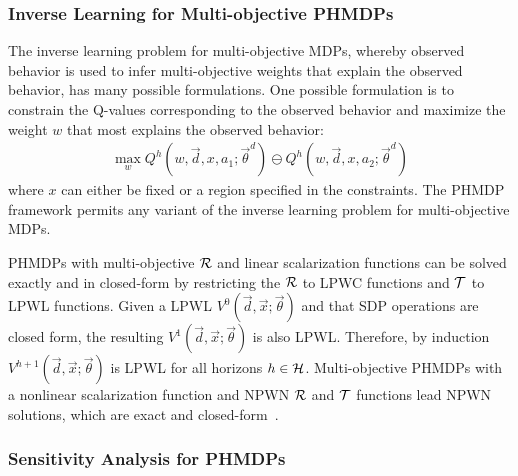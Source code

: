 
\subsubsection{Inverse Learning for Multi-objective PHMDPs}

The inverse learning problem for multi-objective MDPs, whereby observed behavior is used to infer multi-objective weights that explain the observed behavior, has many possible formulations. One possible formulation is to constrain the Q-values corresponding to the observed behavior and maximize the weight {\footnotesize $ w $} that most explains the observed behavior: 
\begin{align}
    \max_w Q^{h} \left(w, \vec{d}, x, a_1; \vec{\theta}^d \right) \ominus Q^{h} \left(w, \vec{d}, x, a_2; \vec{\theta}^d \right)
\end{align}
where {\footnotesize $ x $} can either be fixed or a region specified in the constraints. The PHMDP framework permits any variant of the inverse learning problem for multi-objective MDPs.

PHMDPs with multi-objective {\footnotesize $\mathcal{R}$} and linear scalarization functions can be solved exactly and in closed-form by restricting the {\footnotesize $\mathcal{R}$} to LPWC functions and {\footnotesize $\mathcal{T}$} to LPWL functions. Given a LPWL {\footnotesize $V^{0}(\vec{d}, \vec{x}; \vec{\theta})$} and that SDP operations are closed form, the resulting {\footnotesize $V^{1}(\vec{d}, \vec{x}; \vec{\theta})$} is also LPWL. Therefore, by induction {\footnotesize $V^{h+1}(\vec{d}, \vec{x}; \vec{\theta})$} is LPWL for all horizons {\footnotesize $ h \in \mathcal{H} $}. Multi-objective PHMDPs with a nonlinear scalarization function and NPWN {\footnotesize $\mathcal{R}$} and {\footnotesize $\mathcal{T}$} functions lead NPWN solutions, which are exact and closed-form~\parencite{Sanner_UAI_2011}.

\subsubsection{Sensitivity Analysis for PHMDPs}

